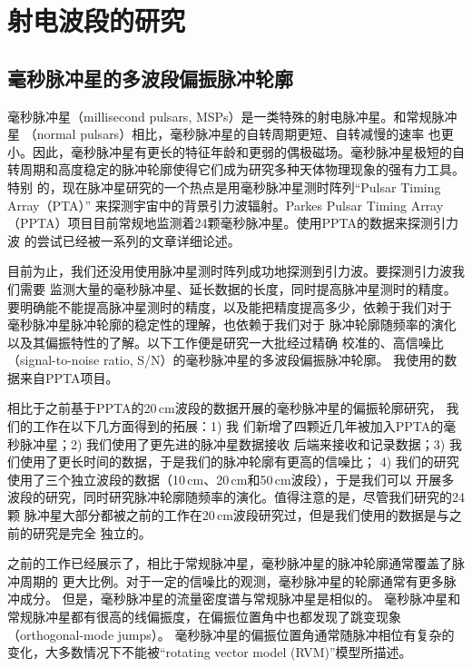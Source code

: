 
\chapter{射电波段的研究}

\section{毫秒脉冲星的多波段偏振脉冲轮廓}

毫秒脉冲星（millisecond pulsars, MSPs）是一类特殊的射电脉冲星。和常规脉冲星
（normal pulsars）相比，毫秒脉冲星的自转周期更短、自转减慢的速率
也更小。因此，毫秒脉冲星有更长的特征年龄和更弱的偶极磁场。毫秒脉冲星极短的自
转周期和高度稳定的脉冲轮廓使得它们成为研究多种天体物理现象的强有力工具。特别
的，现在脉冲星研究的一个热点是用毫秒脉冲星测时阵列“Pulsar Timing Array（PTA）”
来探测宇宙中的背景引力波辐射\supercite{Foster90}。Parkes Pulsar Timing Array
（PPTA）项目目前常规地监测着24颗毫秒脉冲星。使用PPTA的数据来探测引力波
的尝试已经被一系列的文章详细论述\supercite{Shannon13b,Wang15,Zhu14}。

目前为止，我们还没用使用脉冲星测时阵列成功地探测到引力波。要探测引力波我们需要
监测大量的毫秒脉冲星、延长数据的长度，同时提高脉冲星测时的精度\supercite{Cordes12}。
要明确能不能提高脉冲星测时的精度，以及能把精度提高多少，依赖于我们对于
毫秒脉冲星脉冲轮廓的稳定性的理解\supercite{Shannon14}，也依赖于我们对于
脉冲轮廓随频率的演化以及其偏振特性的了解。以下工作便是研究一大批经过精确
校准的、高信噪比（signal-to-noise ratio, S/N）的毫秒脉冲星的多波段偏振脉冲轮廓。
我使用的数据来自PPTA项目。

相比于之前基于PPTA的20\,cm波段的数据开展的毫秒脉冲星的偏振轮廓研究\supercite{Yan11a}，
我们的工作在以下几方面得到的拓展：1) 我
们新增了四颗近几年被加入PPTA的毫秒脉冲星；2) 我们使用了更先进的脉冲星数据接收
后端来接收和记录数据；3) 我们使用了更长时间的数据，于是我们的脉冲轮廓有更高的信噪比；
4) 我们的研究使用了三个独立波段的数据（10\,cm、20\,cm和50\,cm波段），于是我们可以
开展多波段的研究，同时研究脉冲轮廓随频率的演化。值得注意的是，尽管我们研究的24颗
脉冲星大部分都被之前的工作在20\,cm波段研究过，但是我们使用的数据是与之前的研究是完全
独立的。

之前的工作已经展示了，相比于常规脉冲星，毫秒脉冲星的脉冲轮廓通常覆盖了脉冲周期的
更大比例。对于一定的信噪比的观测，毫秒脉冲星的轮廓通常有更多脉冲成分\supercite{Yan11a}。
但是，毫秒脉冲星的流量密度谱与常规脉冲星是相似的\supercite{Toscano98,Kramer98,Kramer99}。
毫秒脉冲星和常规脉冲星都有很高的线偏振度，在偏振位置角中也都发现了跳变现象
（orthogonal-mode jumps）\supercite{Thorsett90,Navarro97,Stairs99,Manchester04,Ord04}。
毫秒脉冲星的偏振位置角通常随脉冲相位有复杂的变化，大多数情况下不能被“rotating vector model (RVM)”模型所描述\supercite{Radhakrishnan69}。


